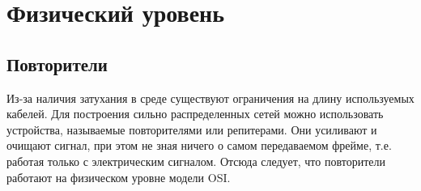 \section{Физический уровень}
\subsection{Повторители}
Из-за наличия затухания в среде существуют ограничения на длину используемых кабелей. Для построения сильно распределенных сетей можно использовать устройства, называемые повторителями или репитерами. Они усиливают и очищают сигнал, при этом не зная ничего о самом передаваемом фрейме, т.е. работая только с электрическим сигналом. Отсюда следует, что повторители работают на физическом уровне модели OSI.
\begin{figure}[ht!]
	\centering
\end{figure}
